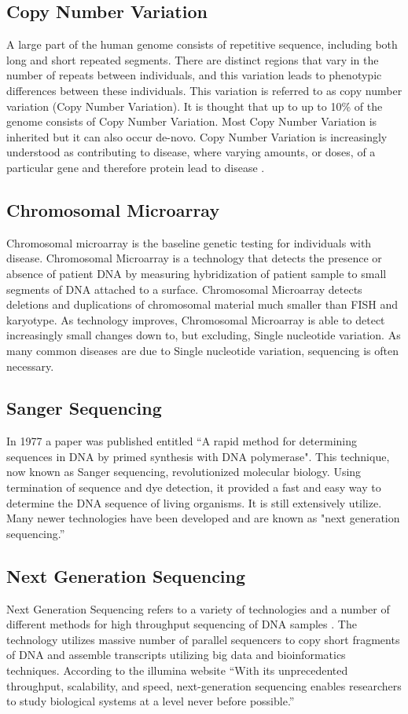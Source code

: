\documentclass[sigconf]{acmart}
\begin{document}
\subsection{Copy Number Variation}
A large part of the human genome consists of repetitive sequence, including both long and short repeated segments.  There are distinct regions that vary in the number of repeats between individuals, and this variation leads to phenotypic differences between these individuals.  This variation is referred to as copy number variation (Copy Number Variation).   It is thought that up to up to 10\% of the genome consists of Copy Number Variation.  Most Copy Number Variation is inherited but it can also occur de-novo.  Copy Number Variation is increasingly understood as contributing to disease, where varying amounts, or doses, of a particular gene and therefore protein lead to disease \cite{zhang2009copy}.   

\subsection{Chromosomal Microarray}
Chromosomal microarray is the baseline genetic testing for individuals with disease. Chromosomal Microarray is a technology that detects the presence or absence of patient DNA by measuring hybridization of patient sample to small segments of DNA attached to a surface.  Chromosomal Microarray detects deletions and duplications of chromosomal material much smaller than FISH and karyotype.  As technology improves, Chromosomal Microarray is able to detect increasingly small changes down to, but excluding, Single nucleotide variation.  As many common diseases are due to Single nucleotide variation, sequencing is often necessary. \cite{wapner2012chromosomal}

\subsection{Sanger Sequencing}
In 1977 a paper was published entitled ``A rapid method for determining sequences in DNA by primed synthesis with DNA polymerase".  This technique, now known as Sanger sequencing, revolutionized molecular biology.  Using termination of sequence and dye detection, it provided a fast and easy way to determine the DNA sequence of living organisms. It is still extensively utilize. Many newer technologies have been developed and are known as "next generation sequencing.'' \cite{schuster2008next}   

\subsection{Next Generation Sequencing}
Next Generation Sequencing refers to a variety of technologies and a number of different methods for high throughput sequencing of DNA samples \cite{reis2009next}.  The technology utilizes massive number of parallel sequencers to copy short fragments of DNA and assemble transcripts utilizing big data and bioinformatics techniques.  According to the illumina website ``With its unprecedented throughput, scalability, and speed, next-generation sequencing enables researchers to study biological systems at a level never before possible.''
\end{document}
